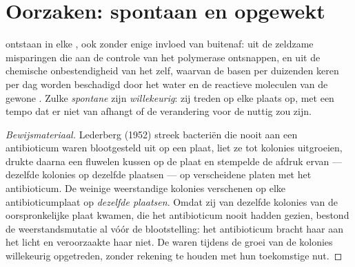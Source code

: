 \section{Oorzaken: spontaan en opgewekt}

\begin{proposition}\label{prop:g11:mutations:spontaneous}
 ontstaan in elke , ook zonder enige invloed van buitenaf:
uit de zeldzame misparingen die aan de controle van het polymerase
ontsnappen, en uit de chemische onbestendigheid van het  zelf, waarvan
de basen per  duizenden keren per dag worden beschadigd door het water
en de reactieve moleculen van de gewone . Zulke
\emph{spontane } zijn \emph{willekeurig}: zij treden op elke
plaats op, met een tempo dat er niet van afhangt of de verandering voor
de  nuttig zou zijn.
\end{proposition}
\begin{proof}[Bewijsmateriaal]
Lederberg (1952) streek bacteriën die nooit aan een antibioticum waren
blootgesteld uit op een plaat, liet ze tot kolonies uitgroeien, drukte
daarna een fluwelen kussen op de plaat en stempelde de afdruk ervan ---
dezelfde kolonies op dezelfde plaatsen --- op verscheidene platen met het
antibioticum. De weinige weerstandige kolonies verschenen op elke
antibioticumplaat op \emph{dezelfde plaatsen}. Omdat zij van dezelfde
kolonies van de oorspronkelijke plaat kwamen, die het antibioticum nooit
hadden gezien, bestond de weerstandsmutatie al vóór de blootstelling: het
antibioticum bracht haar aan het licht en veroorzaakte haar niet. De
 waren tijdens de groei van de kolonies willekeurig opgetreden,
zonder rekening te houden met hun toekomstige nut.
\end{proof}

